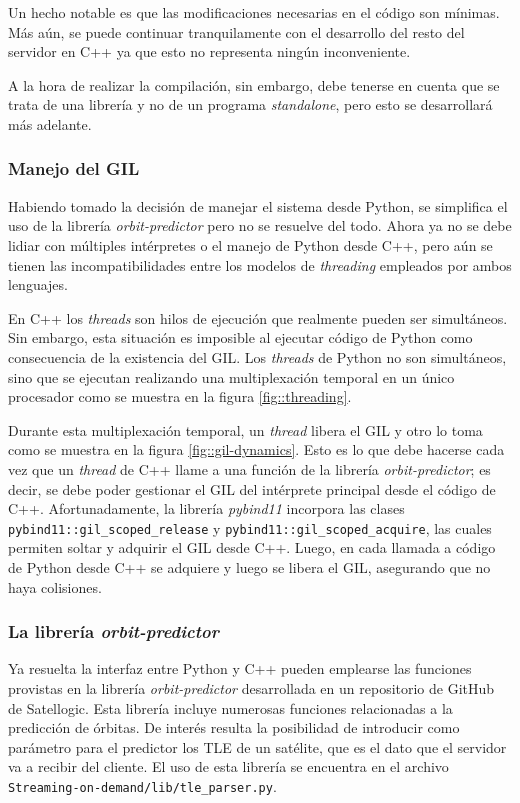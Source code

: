 \documentclass[../../main.tex]{subfiles}
\begin{document}
Un hecho notable es que las modificaciones necesarias en el código son mínimas. Más aún, se puede continuar tranquilamente con el desarrollo del resto del servidor en C++ ya que esto no representa ningún inconveniente. 

A la hora de realizar la compilación, sin embargo, debe tenerse en cuenta que se trata de una librería y no de un programa \textit{standalone}, pero esto se desarrollará más adelante.

\subsubsection{Manejo del GIL}
Habiendo tomado la decisión de manejar el sistema desde Python, se simplifica el uso de la librería \textit{orbit-predictor} pero no se resuelve del todo. Ahora ya no se debe lidiar con múltiples intérpretes o el manejo de Python desde C++, pero aún se tienen las incompatibilidades entre los modelos de \textit{threading} empleados por ambos lenguajes.

En C++ los \textit{threads} son hilos de ejecución que realmente pueden ser simultáneos. Sin embargo, esta situación es imposible al ejecutar código de Python como consecuencia de la existencia del GIL. Los \textit{threads} de Python no son simultáneos, sino que se ejecutan realizando una multiplexación temporal en un único procesador como se muestra en la figura \ref{fig::threading}.

Durante esta multiplexación temporal, un \textit{thread} libera el GIL y otro lo toma como se muestra en la figura \ref{fig::gil-dynamics}. Esto es lo que debe hacerse cada vez que un \textit{thread} de C++ llame a una función de la librería \textit{orbit-predictor}; es decir, se debe poder gestionar el GIL del intérprete principal desde el código de C++. 
Afortunadamente, la librería \textit{pybind11} incorpora las clases \texttt{pybind11::gil\_scoped\_release} y \texttt{pybind11::gil\_scoped\_acquire}, las cuales permiten soltar y adquirir el GIL desde C++. Luego, en cada llamada a código de Python desde C++ se adquiere y luego se libera el GIL, asegurando que no haya colisiones.



\subsubsection{La librería \textit{orbit-predictor}}
Ya resuelta la interfaz entre Python y C++ pueden emplearse las funciones provistas en la librería \textit{orbit-predictor} desarrollada en un repositorio de GitHub de Satellogic\cite{orbit-predictor}. Esta librería incluye numerosas funciones relacionadas a la predicción de órbitas. De interés resulta la posibilidad de introducir como parámetro para el predictor los TLE de un satélite, que es el dato que el servidor va a recibir del cliente.
El uso de esta librería se encuentra en el archivo \texttt{Streaming-on-demand/lib/tle\_parser.py}. 
\end{document}
